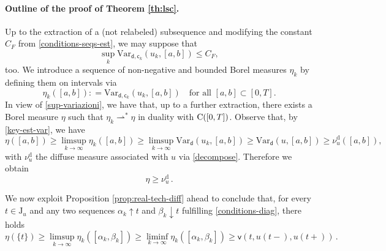 \documentclass[a4paper,10pt,reqno]{amsart} %
\numberwithin{equation}{section}
\newcommand{\up}{\uparrow}
\newcommand{\down}{\downarrow}
\newcommand{\weaksto}{\rightharpoonup^*}
\newcommand{\mdn}{\mathsf{d}}
\newcommand{\Vari}[4]{\mathrm{Var}_{#1}(#2,[#3,#4])}
\newcommand{\lli}[2]{{#1}({#2}{-})}
\newcommand{\rli}[2]{{#1}({#2}{+})}
\newcommand{\jump}[1]{\mathrm{J}_{#1}}
\newcommand{\mum}[2]{\nu_{#1}^{#2}}
\newcommand{\vecostname}{\mathsf{c}}
\newcommand{\vecostnamep}[1]{\mathsf{c}_{#1}}
\newcommand{\bvcost}[3]{\mathsf{v}(#1,#2,#3)}
\newcommand{\RRR}{\color{red}}
\begin{document}
\paragraph{\bf Outline of the proof of Theorem   \ref{th:lsc}.} 
Up to the extraction of a (not relabeled) subsequence and modifying the constant $C_F$ from \eqref{conditions-seqs-est}, we may suppose that 
\begin{equation}
\label{sup-variazioni}
 \sup_k \Vari{\mdn,\vecostnamep k}{u_{k}}{a}{b}\leq C_F, 
\end{equation} 
too.
We introduce a sequence of  non-negative and bounded Borel measures $\eta_k$ by defining them on intervals
 via 
\[ 
\eta_k ([a,b]): =   \Vari{\mdn,\vecostnamep k}{u_{k}}{a}{b}  \quad \text{for all } [a,b]\subset [0,T].
\]
In view of \eqref{sup-variazioni}, we have that, up to a further extraction, there exists a Borel measure $\eta$ such that $\eta_k\weaksto \eta$ in duality with ${\mathrm C}([0,T])$. 
Observe that, by \eqref{key-est-var},  we have 
\[
\eta([a,b])\geq \limsup_{k\to\infty}\eta_k ([a,b]) \geq \limsup_{k\to\infty} \Vari{\mdn}{u_{k}}{a}{b} \geq \Vari{\mdn}{u}{a}{b} \geq \mum u{\mathrm{d}} ([a,b]),
\]
with $ \mum u{\mathrm{d}} $ the diffuse measure associated with $u$ via \eqref{decompose}. Therefore we obtain 
\begin{equation}
\label{step1}
\eta \geq  \mum u{\mathrm{d}}\,.
\end{equation}
\par
We now exploit Proposition \ref{prop:real-tech-diff} ahead to conclude that, for every $t\in \jump u$ and any two sequences 
$\alpha_k\up t $ and  $\beta_k \down t$ fulfilling \eqref{conditions-diag},
there holds
\begin{equation}
\label{step2}
\eta(\{t\}) \geq \limsup_{k\to\infty}\eta_k ([\alpha_k,\beta_k]) \geq \liminf_{k\to\infty}\eta_k ([\alpha_k,\beta_k]) \geq \bvcost t{\lli u t }{\rli u t}\,.
\end{equation}
\end{document}
